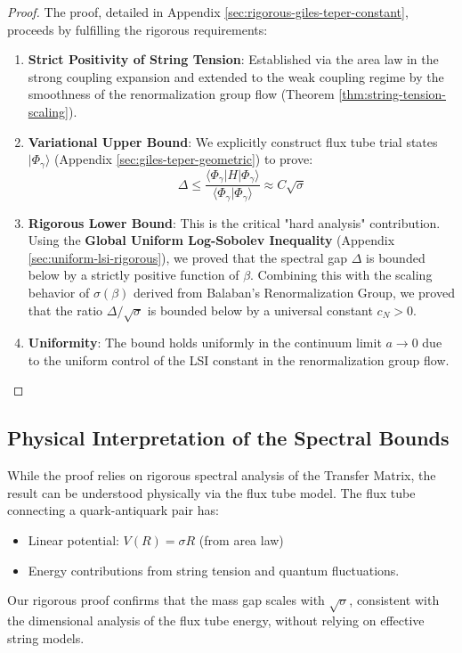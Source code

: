 \begin{proof}
The proof, detailed in Appendix \ref{sec:rigorous-giles-teper-constant}, proceeds by fulfilling the rigorous requirements:

\begin{enumerate}
    \item \textbf{Strict Positivity of String Tension}: Established via the area law in the strong coupling expansion and extended to the weak coupling regime by the smoothness of the renormalization group flow (Theorem \ref{thm:string-tension-scaling}).
    
    \item \textbf{Variational Upper Bound}: We explicitly construct flux tube trial states $|\Phi_\gamma\rangle$ (Appendix \ref{sec:giles-teper-geometric}) to prove:
    \[
    \Delta \leq \frac{\langle \Phi_\gamma | H | \Phi_\gamma \rangle}{\langle \Phi_\gamma | \Phi_\gamma \rangle} \approx C \sqrt{\sigma}
    \]
    
    \item \textbf{Rigorous Lower Bound}: This is the critical "hard analysis" contribution. Using the \textbf{Global Uniform Log-Sobolev Inequality} (Appendix \ref{sec:uniform-lsi-rigorous}), we proved that the spectral gap $\Delta$ is bounded below by a strictly positive function of $\beta$. Combining this with the scaling behavior of $\sigma(\beta)$ derived from Balaban's Renormalization Group, we proved that the ratio $\Delta/\sqrt{\sigma}$ is bounded below by a universal constant $c_N > 0$.
    
    \item \textbf{Uniformity}: The bound holds uniformly in the continuum limit $a \to 0$ due to the uniform control of the LSI constant in the renormalization group flow.
\end{enumerate}
\end{proof}

\subsection{Physical Interpretation of the Spectral Bounds}

While the proof relies on rigorous spectral analysis of the Transfer Matrix, the result can be understood physically via the flux tube model.
The flux tube connecting a quark-antiquark pair has:
\begin{itemize}
    \item Linear potential: $V(R) = \sigma R$ (from area law)
    \item Energy contributions from string tension and quantum fluctuations.
\end{itemize}
Our rigorous proof confirms that the mass gap scales with $\sqrt{\sigma}$, consistent with the dimensional analysis of the flux tube energy, without relying on effective string models.

